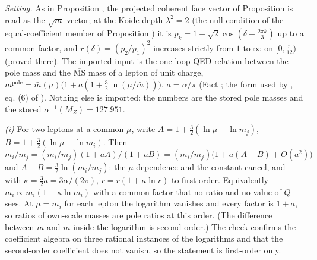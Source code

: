 \emph{Setting.} As in Proposition , the projected coherent face vector of Proposition  is read as the $\sqrt{m}$ vector; at the Koide depth $\lambda^{2} = 2$ (the null condition of the equal-coefficient member of Proposition ) it is $p_{k} = 1 + \sqrt2\cos(\delta + \tfrac{2\pi k}{3})$ up to a common factor, and $r(\delta) = (p_{2}/p_{1})^{2}$ increases strictly from $1$ to $\infty$ on $[0, \tfrac{\pi}{12})$ (proved there). The imported input is the one-loop QED relation between the pole mass and the $\overline{\mathrm{MS}}$ mass of a lepton of unit charge, $m^{\mathrm{pole}} = \bar{m}(\mu)\bigl(1 + a(1 + \tfrac32\ln(\mu/\bar{m}))\bigr)$, $a = \alpha/\pi$ (Fact ; the form used by \cite{Sumino2009}, eq. (6) of \cite{Sumino2009b}). Nothing else is imported; the numbers are the stored pole masses and the stored $\alpha^{-1}(M_{Z}) = 127.951$.

\emph{(i)} For two leptons at a common $\mu$, write $A = 1 + \tfrac32(\ln\mu - \ln m_{j})$, $B = 1 + \tfrac32(\ln\mu - \ln m_{i})$. Then $\bar{m}_{i}/\bar{m}_{j} = (m_{i}/m_{j})(1 + aA)/(1 + aB) = (m_{i}/m_{j})\bigl(1 + a(A - B) + O(a^{2})\bigr)$ and $A - B = \tfrac32\ln(m_{i}/m_{j})$: the $\mu$-dependence and the constant cancel, and with $\kappa = \tfrac32 a = 3\alpha/(2\pi)$, $\bar{r} = r(1 + \kappa\ln r)$ to first order. Equivalently $\bar{m}_{i} \propto m_{i}(1 + \kappa\ln m_{i})$ with a common factor that no ratio and no value of $Q$ sees. At $\mu = \bar{m}_{i}$ for each lepton the logarithm vanishes and every factor is $1 + a$, so ratios of own-scale masses are pole ratios at this order. (The difference between $\bar{m}$ and $m$ inside the logarithm is second order.) The check confirms the coefficient algebra on three rational instances of the logarithms and that the second-order coefficient does not vanish, so the statement is first-order only.

